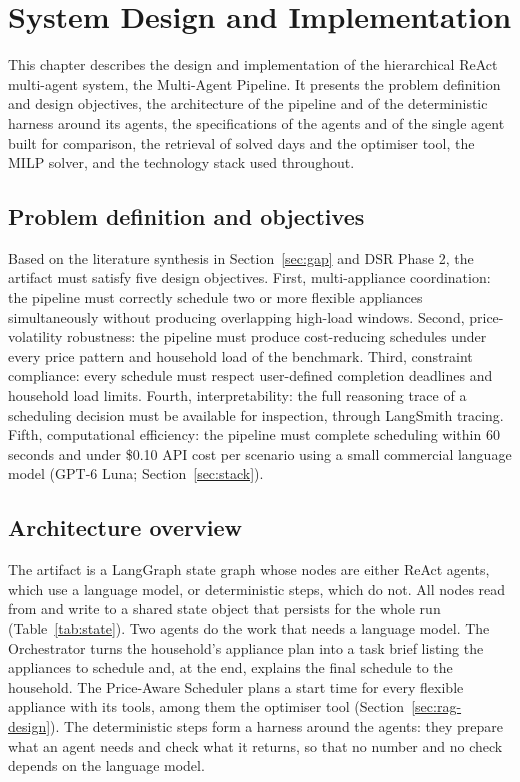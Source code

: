 \documentclass[12pt,a4paper]{report}
\begin{document}
\chapter{System Design and Implementation}
\label{ch:design}

This chapter describes the design and implementation of the hierarchical
ReAct multi-agent system, the Multi-Agent Pipeline. It presents the
problem definition and design objectives, the architecture of the
pipeline and of the deterministic harness around its agents, the
specifications of the agents and of the single agent built for
comparison, the retrieval of solved days and the optimiser tool, the
MILP solver, and the technology stack used throughout.

\section{Problem definition and objectives}
\label{sec:objectives}

Based on the literature synthesis in Section~\ref{sec:gap} and DSR
Phase 2, the artifact must satisfy five design objectives. First,
multi-appliance coordination: the pipeline must correctly schedule two
or more flexible appliances simultaneously without producing overlapping
high-load windows. Second, price-volatility robustness: the pipeline
must produce cost-reducing schedules under every price pattern and
household load of the benchmark.
Third, constraint compliance: every schedule must respect user-defined
completion deadlines and household load limits. Fourth,
interpretability: the full reasoning trace of a scheduling decision
must be available for inspection, through LangSmith tracing. Fifth,
computational efficiency: the
pipeline must complete scheduling within 60 seconds and under \$0.10
API cost per scenario using a small commercial language model
(GPT-6 Luna; Section~\ref{sec:stack}).

\section{Architecture overview}
\label{sec:architecture}

The artifact is a LangGraph state graph whose nodes are either ReAct
agents, which use a language model, or deterministic steps, which do
not. All nodes read from and write to a shared state object that
persists for the whole run (Table~\ref{tab:state}). Two agents do the
work that needs a language model. The Orchestrator turns the
household's appliance plan into a task brief listing the appliances to
schedule and, at the end, explains the final schedule to the household.
The Price-Aware Scheduler plans a start time for every flexible
appliance with its tools, among them the optimiser tool
(Section~\ref{sec:rag-design}). The deterministic steps form a harness
around the agents: they prepare what an agent needs and check what it
returns, so that no number and no check depends on the language model.
\end{document}
